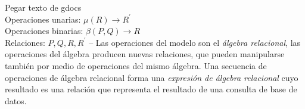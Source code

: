 Pegar texto de gdocs\\
Operaciones unarias: $\mu(R) \rightarrow R^\prime$\\
Operaciones binarias: $\beta(P,Q) \rightarrow R$\\
Relaciones: $P,Q,R,R^\prime$
--
Las operaciones del modelo son el \emph{álgebra relacional}, las operaciones del álgebra producen nuevas relaciones, que pueden manipularse también por medio de operaciones del mismo álgebra. Una secuencia de operaciones de álgebra relacional forma una \emph{expresión de álgebra relacional} cuyo resultado es una relación que representa el resultado de una consulta de base de datos.